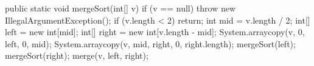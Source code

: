 \begin{unipdcode}[language=Java]
public static void mergeSort(int[] v) {
    if (v == null) throw new IllegalArgumentException();
    if (v.length < 2) return;
    int mid = v.length / 2;
    int[] left = new int[mid];
    int[] right = new int[v.length - mid];
    System.arraycopy(v, 0, left, 0, mid);
    System.arraycopy(v, mid, right, 0, right.length);
    mergeSort(left);
    mergeSort(right);
    merge(v, left, right);
}
\end{unipdcode}
